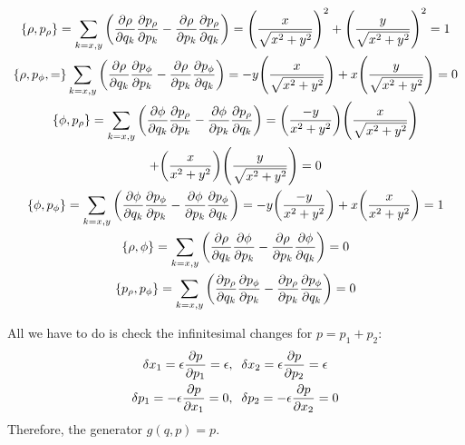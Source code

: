 \documentclass{report}
\theoremstyle{definition}
\begin{document}
\begin{chapter2}\label{prob: 13}
	\begin{gather*}
			\acomm{\rho}{p_{\rho}} = \sum_{k = x, y} \pqty{\pdv{\rho}{q_k}\pdv{p_{\rho}}{p_k} - \pdv{\rho}{p_k}\pdv{p_{\rho}}{q_k}} = \pqty{\frac{x}{\sqrt{x^2 + y ^2}}}^2 + \pqty{\frac{y}{\sqrt{x^2 + y ^2}}}^2 = 1 \\
			\acomm{\rho, p_{\phi}} = \sum_{k = x, y} \pqty{\pdv{\rho}{q_k}\pdv{p_{\phi}}{p_k} - \pdv{\rho}{p_k}\pdv{p_{\phi}}{q_k}} = -y\pqty{\frac{x}{\sqrt{x^2 + y ^2}}} + x\pqty{\frac{y}{\sqrt{x^2 + y ^2}}} = 0 \\
			\acomm{\phi}{p_{\rho}} = \sum_{k = x, y} \pqty{\pdv{\phi}{q_k}\pdv{p_{\rho}}{p_k} - \pdv{\phi}{p_k}\pdv{p_{\rho}}{q_k}} = \pqty{\frac{-y}{x^2 + y ^2}}\pqty{\frac{x}{\sqrt{x^2 + y ^2}}} \notag\\
			+ \pqty{\frac{x}{x^2 + y ^2}}\pqty{\frac{y}{\sqrt{x^2 + y ^2}}} = 0 \\
			\acomm{\phi}{p_{\phi}} = \sum_{k = x, y} \pqty{\pdv{\phi}{q_k}\pdv{p_{\phi}}{p_k} - \pdv{\phi}{p_k}\pdv{p_{\phi}}{q_k}} = -y\pqty{\frac{-y}{x^2 + y ^2}} + x\pqty{\frac{x}{x^2 + y ^2}} = 1 \\
			\acomm{\rho}{\phi} = \sum_{k = x, y} \pqty{\pdv{\rho}{q_k}\pdv{\phi}{p_k} - \pdv{\rho}{p_k}\pdv{\phi}{q_k}} = 0 \\
			\acomm{p_{\rho}}{p_{\phi}} = \sum_{k = x, y} \pqty{\pdv{p_{\rho}}{q_k}\pdv{p_{\phi}}{p_k} - \pdv{p_{\rho}}{p_k}\pdv{p_{\phi}}{q_k}} = 0
		\end{gather*}
\end{chapter2}

\begin{chapter2}\label{prob: 14}
	
\end{chapter2}

\begin{chapter2}\label{prob: 15}
	
\end{chapter2}

\begin{chapter2}\label{prob: 16}
	
\end{chapter2}

\begin{chapter2}\label{prob: 17}
	All we have to do is check the infinitesimal changes for $p = p_1 + p_2$:
		\begin{gather*}
			\delta x_1 = \epsilon \pdv{p}{p_1} = \epsilon, \;\; \delta x_2 = \epsilon \pdv{p}{p_2} = \epsilon \\
			\delta p_1 = -\epsilon \pdv{p}{x_1} = 0, \;\; \delta p_2 = -\epsilon \pdv{p}{x_2} = 0
		\end{gather*}
		Therefore, the generator $g(q,p) = p$. \\\\
\end{chapter2}
\end{document}
